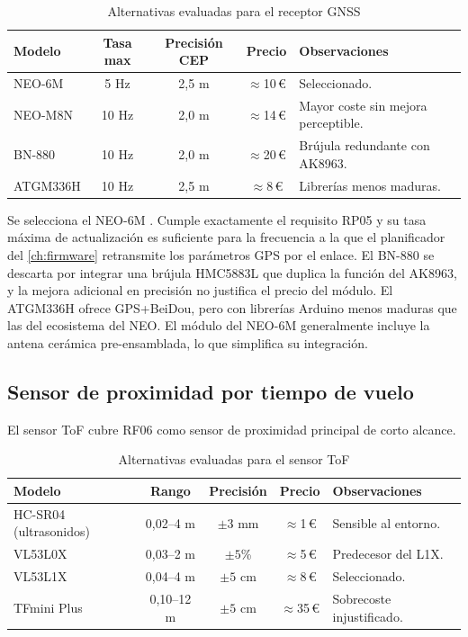 \begin{table}[H]
    \centering
    \caption{Alternativas evaluadas para el receptor GNSS}
    \label{tab:sel_gnss}
    \footnotesize
    \begin{tabularx}{\linewidth}{l c c c X}
        \toprule
        \textbf{Modelo} & \textbf{Tasa max} & \textbf{Precisión CEP} & \textbf{Precio} & \textbf{Observaciones} \\
        \midrule
        NEO-6M   & 5 Hz  & 2,5 m & $\approx$10\,\euro{} & Seleccionado. \\
        NEO-M8N  & 10 Hz & 2,0 m & $\approx$14\,\euro{} & Mayor coste sin mejora perceptible. \\
        BN-880   & 10 Hz & 2,0 m & $\approx$20\,\euro{} & Brújula redundante con AK8963. \\
        ATGM336H & 10 Hz & 2,5 m & $\approx$8\,\euro{}  & Librerías menos maduras. \\
        \bottomrule
    \end{tabularx}
\end{table}

Se selecciona el NEO-6M \cite{ds_neo6}. Cumple exactamente el
requisito RP05 y su tasa máxima de actualización es suficiente para la
frecuencia a la que el planificador del \cref{ch:firmware} retransmite los
parámetros GPS por el enlace. El BN-880 se
descarta por integrar una brújula HMC5883L que duplica la función del
AK8963, y la mejora adicional en precisión no justifica el precio del módulo. El ATGM336H ofrece GPS+BeiDou, pero con librerías Arduino menos maduras que las del ecosistema del NEO. El módulo del NEO-6M generalmente incluye la antena cerámica pre-ensamblada, lo que simplifica su integración.

\subsection{Sensor de proximidad por tiempo de vuelo}
\label{sec:sel_tof}

El sensor ToF cubre RF06 como sensor de proximidad principal de corto
alcance.

\begin{table}[H]
    \centering
    \caption{Alternativas evaluadas para el sensor ToF}
    \label{tab:sel_tof}
    \footnotesize
    \begin{tabularx}{\linewidth}{l c c c X}
        \toprule
        \textbf{Modelo} & \textbf{Rango} & \textbf{Precisión} & \textbf{Precio} & \textbf{Observaciones} \\
        \midrule
        HC-SR04 (ultrasonidos) & 0,02--4 m  & $\pm 3$ mm  & $\approx$1\,\euro{}  & Sensible al entorno. \\
        VL53L0X                & 0,03--2 m  & $\pm 5$\%   & $\approx$5\,\euro{}  & Predecesor del L1X. \\
        VL53L1X                & 0,04--4 m  & $\pm 5$ cm  & $\approx$8\,\euro{}  & Seleccionado. \\
        TFmini Plus            & 0,10--12 m & $\pm 5$ cm  & $\approx$35\,\euro{} & Sobrecoste injustificado. \\
        \bottomrule
    \end{tabularx}
\end{table}

